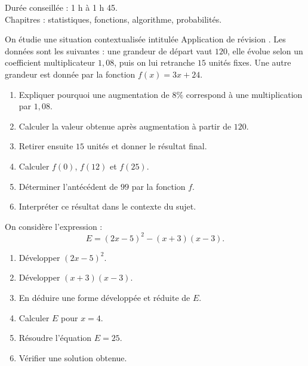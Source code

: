\documentclass[11pt,a4paper]{article}
\newcounter{exercice}
\begin{document}
\begin{objectif}
Durée conseillée : 1 h à 1 h 45.\\
Chapitres : statistiques, fonctions, algorithme, probabilités.
\end{objectif}
\begin{exercice}
On étudie une situation contextualisée intitulée \og Application de révision \fg. Les données sont les suivantes : une grandeur de départ vaut $120$, elle évolue selon un coefficient multiplicateur $1{,}08$, puis on lui retranche $15$ unités fixes. Une autre grandeur est donnée par la fonction $f(x)=3x+24$.
\begin{enumerate}
  \item Expliquer pourquoi une augmentation de $8\%$ correspond à une multiplication par $1{,}08$.
  \item Calculer la valeur obtenue après augmentation à partir de $120$.
  \item Retirer ensuite $15$ unités et donner le résultat final.
  \item Calculer $f(0)$, $f(12)$ et $f(25)$.
  \item Déterminer l'antécédent de $99$ par la fonction $f$.
  \item Interpréter ce résultat dans le contexte du sujet.
\end{enumerate}
\end{exercice}

\begin{exercice}
On considère l'expression :
\[
E=(2x-5)^2-(x+3)(x-3).
\]
\begin{enumerate}
  \item Développer $(2x-5)^2$.
  \item Développer $(x+3)(x-3)$.
  \item En déduire une forme développée et réduite de $E$.
  \item Calculer $E$ pour $x=4$.
  \item Résoudre l'équation $E=25$.
  \item Vérifier une solution obtenue.
\end{enumerate}
\end{exercice}
\end{document}
